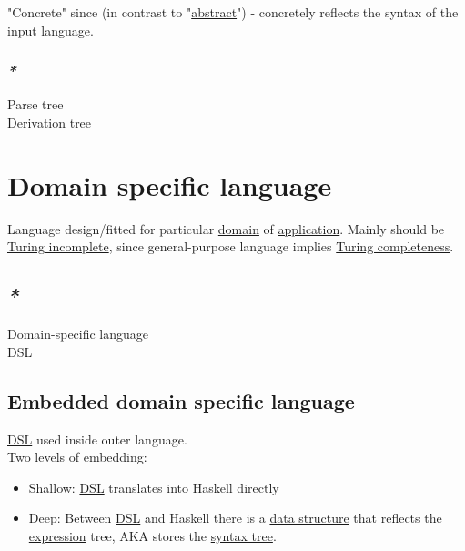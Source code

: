 \documentclass[a4paper,14pt,oneside]{book}
\begin{document}
"Concrete" since (in contrast to "\hyperref[orgb942bc6]{abstract}") - concretely reflects the syntax of the input language.\\

\subsection{\emph{*}}
\label{sec:org6de6cf3}

\label{org9cf7e17}Parse tree\\
\label{orge307ef7}Derivation tree\\

\chapter{\label{org2686d10}Domain specific language}
\label{sec:org9b7c365}
Language design/fitted for particular \hyperref[org2ec54f8]{domain} of \hyperref[org1793e06]{application}. Mainly should be \hyperref[org8a0bafd]{Turing incomplete}, since general-purpose language implies \hyperref[orgcad9624]{Turing completeness}.\\

\section{\emph{*}}
\label{sec:org63f4e3c}

\label{orgffcb477}Domain-specific language\\
\label{orgab4617f}DSL\\

\section{\label{orgf5ae075}Embedded domain specific language}
\label{sec:orgb5f69c6}

\hyperref[orgab4617f]{DSL} used inside outer language.\\

Two levels of embedding:\\

\begin{itemize}
\item Shallow: \hyperref[orgab4617f]{DSL} translates into Haskell directly\\
\item Deep: Between \hyperref[orgab4617f]{DSL} and Haskell there is a \hyperref[org57d6a15]{data structure} that reflects the \hyperref[org4eaaefd]{expression} tree, AKA stores the \hyperref[orgd1990d1]{syntax tree}.\\
\end{itemize}
\end{document}
